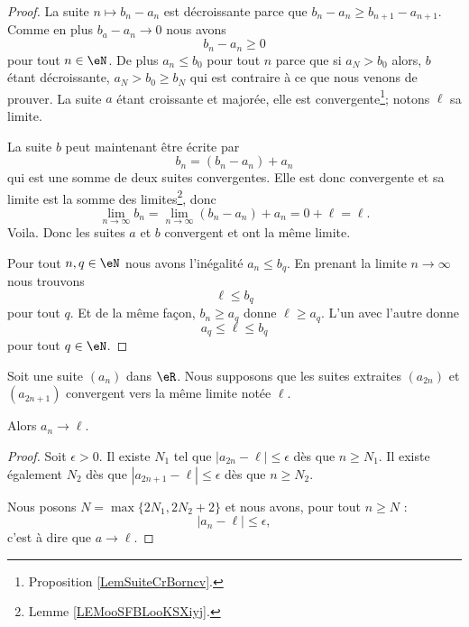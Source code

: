 \begin{proof}
    La suite \( n\mapsto b_n-a_n\) est décroissante parce que \( b_n-a_n\geq b_{n+1}-a_{n+1}\). Comme en plus \( b_a-a_n\to 0\) nous avons
    \begin{equation}
        b_n-a_n\geq 0
    \end{equation}
    pour tout \( n\in \eN\). De plus \( a_n\leq b_0\) pour tout \( n\) parce que si \( a_N>b_0\) alors, \( b\) étant décroissante, \( a_N>b_0\geq b_N\) qui est contraire à ce que nous venons de prouver. La suite \( a\) étant croissante et majorée, elle est convergente\footnote{Proposition \ref{LemSuiteCrBorncv}.}; notons \( \ell\) sa limite.

    La suite \( b\) peut maintenant être écrite par
    \begin{equation}
        b_n=(b_n-a_n)+a_n
    \end{equation}
    qui est une somme de deux suites convergentes. Elle est donc convergente et sa limite est la somme des limites\footnote{Lemme \ref{LEMooSFBLooKSXiyj}.}, donc
    \begin{equation}
        \lim_{n\to \infty} b_n=\lim_{n\to \infty} (b_n-a_n)+a_n=0+\ell=\ell.
    \end{equation}
    Voila. Donc les suites \( a\) et \( b\) convergent et ont la même limite.

    Pour tout \( n,q\in \eN\) nous avons l'inégalité \( a_n\leq b_q\). En prenant la limite \( n\to \infty\) nous trouvons
    \begin{equation}
        \ell\leq b_q
    \end{equation}
    pour tout \( q\). Et de la même façon, \( b_n\geq a_q\) donne \( \ell\geq a_q\). L'un avec l'autre donne
    \begin{equation}
        a_q\leq \ell\leq b_q
    \end{equation}
    pour tout \( q\in \eN\).
\end{proof}

\begin{proposition}      \label{PROPooXOOCooGMqJNe}
    Soit une suite \( (a_n)\) dans \( \eR\).  Nous supposons que les suites extraites \( (a_{2n})\) et \( (a_{2n+1})\) convergent vers la même limite notée \( \ell\).

    Alors \( a_n\to \ell\).
\end{proposition}

\begin{proof}
    Soit \( \epsilon>0\). Il existe \( N_1\) tel que \( | a_{2n}-\ell |\leq \epsilon\) dès que \( n\geq N_1\). Il existe également \( N_2\) dès que \( | a_{2n+1}-\ell |\leq \epsilon\) dès que \( n\geq N_2\).

    Nous posons \( N=\max\{ 2N_1,2N_2+2 \}\) et nous avons, pour tout \( n\geq N\) :
    \begin{equation}
        | a_n-\ell |\leq \epsilon,
    \end{equation}
    c'est à dire que \( a\to \ell\).
\end{proof}

